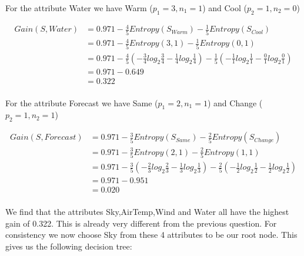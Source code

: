 \documentclass[10pt,a4paper]{article}
\begin{document}
{{{{{{{{{{For the attribute Water we have Warm ($p_1=3,n_1=1$) and Cool ($p_2=1,n_2=0$)

\begin{equation}
\begin{split}
Gain(S,Water) &= 0.971 - \frac{4}{5} Entropy(S_{Warm} ) - \frac{1}{5}Entropy(S_{Cool}) \\
          &= 0.971 - \frac{4}{5} Entropy(3,1) - \frac{1}{5}Entropy(0,1) \\
          &= 0.971 -\frac{4}{5} ( -\frac{3}{4} log_2\frac{3}{4} -\frac{1}{4} log_2\frac{1}{4} ) - \frac{1}{5}(-\frac{1}{1} log_2\frac{1}{1} - \frac{0}{1}log_2\frac{0}{1} ) \\
          &= 0.971 - 0.649\\
          &= 0.322 \\
\end{split}
\end{equation}

For the attribute Forecast we have Same ($p_1=2,n_1=1$) and Change ($p_2=1,n_2=1$)

\begin{equation}
\begin{split}
Gain(S,Forecast) &= 0.971 - \frac{3}{5} Entropy(S_{Same} ) - \frac{2}{5}Entropy(S_{Change}) \\
          &= 0.971 - \frac{3}{5} Entropy(2,1) - \frac{2}{5}Entropy(1,1) \\
          &= 0.971 -\frac{3}{5} ( -\frac{2}{3} log_2\frac{2}{3} -\frac{1}{3} log_2\frac{1}{3} ) - \frac{2}{5}(-\frac{1}{2} log_2\frac{1}{2} - \frac{1}{2}log_2\frac{1}{2} ) \\
          &= 0.971 - 0.951\\
          &= 0.020 \\
\end{split}
\end{equation}

We find that the attributes Sky,AirTemp,Wind and Water all have the highest gain of 0.322. This is already very different from the previous question. For consistency we now choose Sky from these 4 attributes to be our root node. This gives us the following decision tree:


}}}}}}}}}}
\end{document}
